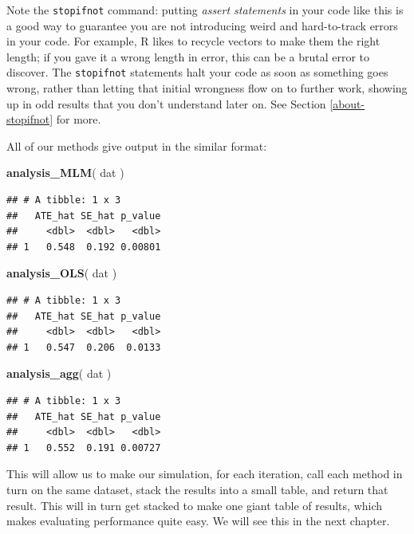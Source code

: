 \documentclass[
]{book}
\newenvironment{Shaded}{\begin{snugshade}}{\end{snugshade}}
\newcommand{\FunctionTok}[1]{\textcolor[rgb]{0.13,0.29,0.53}{\textbf{#1}}}
\newcommand{\NormalTok}[1]{#1}
\begin{document}
Note the \texttt{stopifnot} command: putting \emph{assert statements} in your code like this is a good way to guarantee you are not introducing weird and hard-to-track errors in your code.
For example, R likes to recycle vectors to make them the right length; if you gave it a wrong length in error, this can be a brutal error to discover.
The \texttt{stopifnot} statements halt your code as soon as something goes wrong, rather than letting that initial wrongness flow on to further work, showing up in odd results that you don't understand later on.
See Section \ref{about-stopifnot} for more.

All of our methods give output in the similar format:

\begin{Shaded}
\begin{Highlighting}[]
\FunctionTok{analysis\_MLM}\NormalTok{( dat )}
\end{Highlighting}
\end{Shaded}

\begin{verbatim}
## # A tibble: 1 x 3
##   ATE_hat SE_hat p_value
##     <dbl>  <dbl>   <dbl>
## 1   0.548  0.192 0.00801
\end{verbatim}

\begin{Shaded}
\begin{Highlighting}[]
\FunctionTok{analysis\_OLS}\NormalTok{( dat )}
\end{Highlighting}
\end{Shaded}

\begin{verbatim}
## # A tibble: 1 x 3
##   ATE_hat SE_hat p_value
##     <dbl>  <dbl>   <dbl>
## 1   0.547  0.206  0.0133
\end{verbatim}

\begin{Shaded}
\begin{Highlighting}[]
\FunctionTok{analysis\_agg}\NormalTok{( dat )}
\end{Highlighting}
\end{Shaded}

\begin{verbatim}
## # A tibble: 1 x 3
##   ATE_hat SE_hat p_value
##     <dbl>  <dbl>   <dbl>
## 1   0.552  0.191 0.00727
\end{verbatim}

This will allow us to make our simulation, for each iteration, call each method in turn on the same dataset, stack the results into a small table, and return that result.
This will in turn get stacked to make one giant table of results, which makes evaluating performance quite easy.
We will see this in the next chapter.
\end{document}
